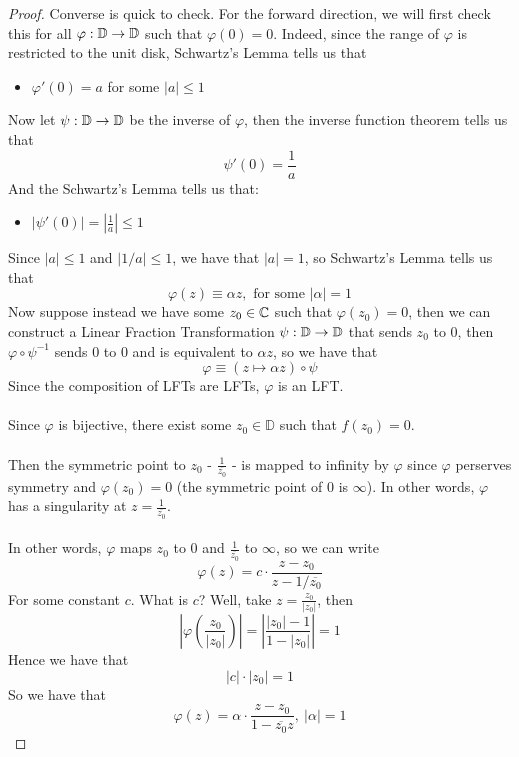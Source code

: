 \begin{proof}
    Converse is quick to check. For the forward direction, we will first check this for all $\varphi: \mathbb{D} \to \mathbb{D}$ such that $\varphi(0) = 0$. Indeed, since the range of $\varphi$ is restricted to the unit disk, Schwartz's Lemma tells us that
    \begin{itemize}
        \item $\varphi'(0) = a$ for some $|a| \leq 1$
    \end{itemize}
    Now let $\psi: \mathbb{D} \to \mathbb{D}$ be the inverse of $\varphi$, then the inverse function theorem tells us that
    \[\psi'(0) = \frac{1}{a}\]
    And the Schwartz's Lemma tells us that:
    \begin{itemize}
        \item $|\psi'(0)| = |\frac{1}{a}| \leq 1$
    \end{itemize}
    Since $|a| \leq 1$ and $|1/a| \leq 1$, we have that $|a| = 1$, so Schwartz's Lemma tells us that
    \[\varphi(z) \equiv \alpha z, \text{ for some $|\alpha| = 1$}\]
    Now suppose instead we have some $z_0 \in \mathbb{C}$ such that $\varphi(z_0) = 0$, then we can construct a Linear Fraction Transformation $\psi: \mathbb{D} \to \mathbb{D}$ that sends $z_0$ to $0$, then $\varphi \circ \psi^{-1}$ sends $0$ to $0$ and is equivalent to $\alpha z$, so we have that
    \[\varphi \equiv (z \mapsto \alpha z) \circ \psi\]
    Since the composition of LFTs are LFTs, $\varphi$ is an LFT.\\\\
     Since $\varphi$ is bijective, there exist some $z_0 \in \mathbb{D}$ such that $f(z_0) = 0$.\\\\
    Then the symmetric point to $z_0$ - $\frac{1}{\overline{z_0}}$ - is mapped to infinity by $\varphi$ since $\varphi$ perserves symmetry and $\varphi(z_0) = 0$ (the symmetric point of $0$ is $\infty$). In other words, $\varphi$ has a singularity at $z = \frac{1}{\overline{z_0}}$.\\\\
    In other words, $\varphi$ maps $z_0$ to $0$ and $\frac{1}{\overline{z_0}}$ to $\infty$, so we can write
    \[\varphi(z) = c \cdot \frac{z - z_0}{z - 1/\overline{z_0}}\]
    For some constant $c$. What is $c$? Well, take $z = \frac{z_0}{|z_0|}$, then
    \[|\varphi(\frac{z_0}{|z_0|})| = |\frac{|z_0| - 1}{1 - |z_0|}| = 1\]
    Hence we have that
    \[|c| \cdot |z_0| = 1\]
    So we have that
    \[\varphi(z) = \alpha \cdot \frac{z - z_0}{1 - \overline{z_0} z},\ |\alpha| = 1\]
\end{proof}

